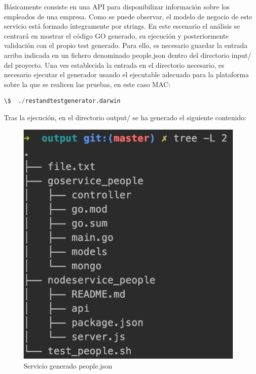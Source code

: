 \documentclass[a4paper,11pt]{book}
\begin{document}
Básicamente consiste en una API para disponibilizar información sobre los empleados de una empresa. Como se puede observar, el modelo de negocio de este servicio está formado íntegramente por strings.
En este escenario el análisis se centrará en mostrar el código GO generado, su ejecución y posteriormente validación con el propio test generado. Para ello, es necesario guardar la entrada arriba indicada en un fichero denominado people.json dentro del directorio input/ del proyecto. Una ves establecida la entrada en el directorio necesario, es necesario ejecutar el generador usando el ejecutable adecuado para la plataforma sobre la que se realicen las pruebas, en este caso MAC: 

\begin{lstlisting}[language=python,caption={ Ejemplo Entrada Generador: people.json }]
\$  ./restandtestgenerator.darwin 
\end{lstlisting} 

Tras la ejecución, en el directorio output/ se ha generado el siguiente contenido:

\begin{figure}[H]  
\centering 
\includegraphics[scale=0.35]{imagenes/t11.png}
\caption{ Servicio generado people.json}  
\end{figure}
\end{document}
